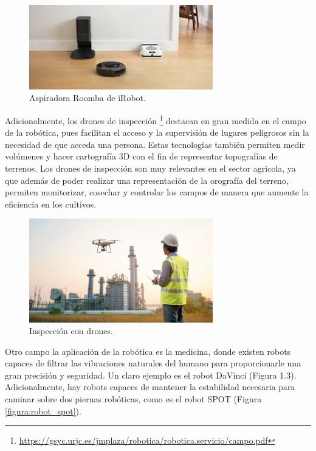 \documentclass[a4paper, 12pt]{book}
\begin{document}
\begin{figure}[H]
	\centering
    \includegraphics[width=8cm, keepaspectratio]{img/ipack.jpeg}
    \caption{Aspiradora Roomba de iRobot.}
    \label{figura:aspiradora_autonoma}
\end{figure}

Adicionalmente, los drones de inspección \footnote{\url{https://gsyc.urjc.es/jmplaza/robotica/robotica.servicio/campo.pdf}} destacan en gran medida en el campo de la robótica, pues facilitan el acceso y la supervisión de lugares peligrosos sin la necesidad de que acceda una persona. Estas tecnologías también permiten medir volúmenes y hacer cartografía 3D con el fin de representar topografías de terrenos. Los drones de inspección son muy relevantes en el sector agrícola, ya que además de poder realizar una representación de la orografía del terreno, permiten monitorizar, cosechar y controlar los campos de manera que aumente la eficiencia en los cultivos.

\begin{figure}[H]
	\centering
    \includegraphics[width=8cm, keepaspectratio]{img/inpeccion_drones.jpg}
    \caption{Inspección con drones.}
    \label{figura:inspeccion_drones´}
\end{figure}

Otro campo la aplicación de la robótica es la medicina, donde existen robots capaces de filtrar las vibraciones naturales del humano para proporcionarle una gran precisión y seguridad. Un claro ejemplo es el robot DaVinci (Figura 1.3). Adicionalmente, hay robots capaces de mantener la estabilidad necesaria para caminar sobre dos piernas robóticas, como es el robot SPOT (Figura \ref{figura:robot_spot}).
\end{document}
